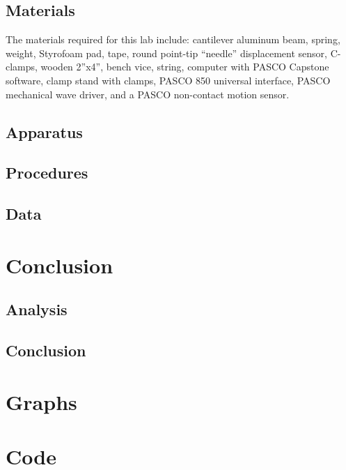 \documentclass[12 pt]{report}
\begin{document}
\section{Materials} \label{materials}
The materials required for this lab include: cantilever aluminum beam, spring, weight, Styrofoam pad, tape, round point-tip ``needle'' displacement sensor, C-clamps, wooden 2''x4'', bench vice, string, computer with PASCO Capstone software, clamp stand with clamps, PASCO 850 universal interface, PASCO mechanical wave driver, and a PASCO non-contact motion sensor.

\section{Apparatus} \label{apparatus}


\section{Procedures} \label{procedures}


\section{Data} \label{data}


\chapter{Conclusion} \label{conclusion-chapter}
\section{Analysis} \label{analysis}


\section{Conclusion} \label{conclusion-section}


\printbibliography[heading=subbibintoc]

\appendix
\chapter{Graphs} \label{graphs}


\chapter{Code} \label{code}
\end{document}
